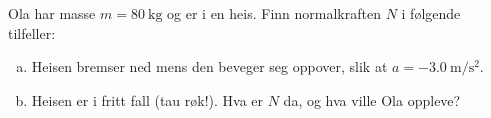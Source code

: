 %
Ola har masse $m = \SI{80}{\kilo\gram}$ og er i en heis. Finn normalkraften $N$ i følgende tilfeller:
\begin{enumerate}[a)]
    \item Heisen bremser ned mens den beveger seg oppover, slik at $a = \SI{-3.0}{\metre\per\second\squared}$.
    \item Heisen er i fritt fall (tau røk!). Hva er $N$ da, og hva ville Ola oppleve?
\end{enumerate}

